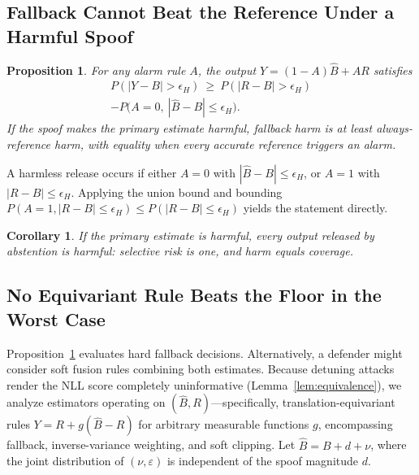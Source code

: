 \documentclass[conference]{IEEEtran}
\newcommand{\Bhat}{\widehat{B}}
\newtheorem{proposition}{Proposition}
\newtheorem{corollary}{Corollary}
\begin{document}
\subsection{Fallback Cannot Beat the Reference Under a Harmful Spoof}

\begin{proposition}\label{prop:bound}
For any alarm rule $A$, the output $Y=(1-A)\Bhat+AR$ satisfies
\begin{multline}
 P(|Y-B|>\epsilon_H)\ \ge\ P(|R-B|>\epsilon_H)\\
 -P\bigl(A=0,\ |\Bhat-B|\le\epsilon_H\bigr).
 \label{eq:bound}
\end{multline}
If the spoof makes the primary estimate harmful, fallback harm is at least always-reference harm, with equality when every accurate reference triggers an alarm.
\end{proposition}
\begin{IEEEproof}
A harmless release occurs if either $A=0$ with $|\Bhat-B|\le\epsilon_H$, or $A=1$ with $|R-B|\le\epsilon_H$. Applying the union bound and bounding $P(A=1, |R-B\vert{}\le\epsilon_H) \le P(|R-B\vert{}\le\epsilon_H)$ yields the statement directly.
\end{IEEEproof}

\begin{corollary}\label{cor:abstain}
If the primary estimate is harmful, every output released by abstention is harmful: selective risk is one, and harm equals coverage.
\end{corollary}

\subsection{No Equivariant Rule Beats the Floor in the Worst Case}

Proposition~\ref{prop:bound} evaluates hard fallback decisions. Alternatively, a defender might consider soft fusion rules combining both estimates. Because detuning attacks render the NLL score completely uninformative (Lemma~\ref{lem:equivalence}), we analyze estimators operating on $(\Bhat,R)$—specifically, translation-equivariant rules $Y = R + g(\Bhat - R)$ for arbitrary measurable functions $g$, encompassing fallback, inverse-variance weighting, and soft clipping. Let $\Bhat = B + d + \nu$, where the joint distribution of $(\nu, \varepsilon)$ is independent of the spoof magnitude $d$.
\end{document}
